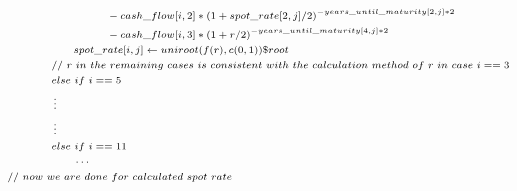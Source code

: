 \documentclass[10pt]{article}
\begin{document}
\begin{enumerate}
\begin{enumerate}
$$\begin{scriptsize}
\begin{aligned}
            & \qquad \qquad \qquad \qquad \quad - cash\_flow[i,2]*(1 + spot\_rate[2,j]/2)^{-years\_until\_maturity[2,j]*2} \\
            & \qquad \qquad \qquad \qquad \quad -cash\_flow[i,3]*(1 + r/2)^{- years\_until\_maturity[4,j] * 2} \\
            & \qquad \qquad \qquad spot\_rate[i,j] \leftarrow uniroot(f(r), c(0,1))\$root \\
            & \qquad \qquad // \ r \ in \ the \ remaining \ cases \ is \ consistent \ with \ the \ calculation \ method \ of \ r \ in \ case \ i == 3 \\
            & \qquad \qquad else \ if \ i == 5 \\
            & \qquad \qquad \vdots \\
            & \qquad \qquad \vdots \\
            & \qquad \qquad else \ if \ i == 11 \\
            & \qquad \qquad \qquad \cdots \\
            & // \ now \ we \ are \ done \ for \ calculated \ spot \ rate 
            \end{aligned}
            \end{scriptsize}
            $$ 
            

\end{enumerate}
\end{enumerate}
\end{document}
